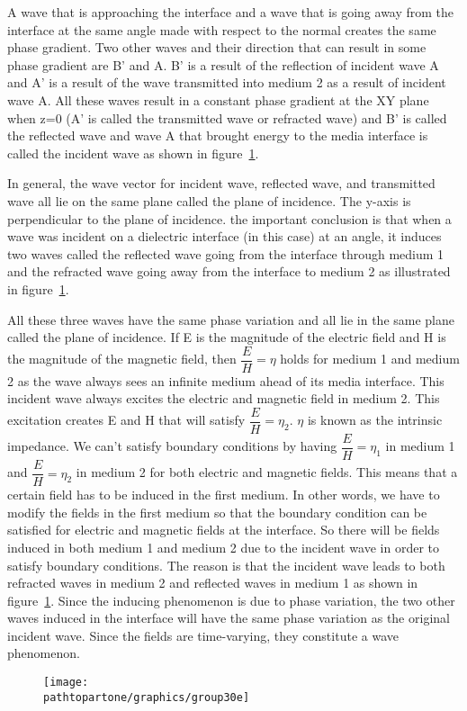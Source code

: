 A wave that is approaching the interface and a wave that is going away from the interface at the same angle made with respect to the normal creates the same phase gradient. Two other waves and their direction that can result in some phase gradient are B'
and A. B' is a result of the reflection of incident wave A and A' is a result of the wave transmitted into medium 2 as a result of incident wave A. All these waves result in a constant phase gradient at the XY plane when z=0 (A' is called the transmitted wave or refracted wave) and B' is called the reflected wave and wave A that brought energy to the media interface is called the incident wave as shown in figure~\ref{fig:group30e}.

In general, the wave vector for incident wave, reflected wave, and transmitted wave all lie on the same plane called the plane of incidence. The y-axis is perpendicular to the plane of incidence. the important conclusion is that when a wave was incident on a dielectric interface (in this case) at an angle, it induces two waves called the reflected wave going from the interface through medium 1  and the refracted wave going away from the interface to medium 2 as illustrated in figure~\ref{fig:group30e}.

All these three waves have the same phase variation and all lie in the same plane called the plane of incidence. If E is the magnitude of the electric field and H is the magnitude of the magnetic field, then $\dfrac{E}{H}=\eta$ holds for medium 1 and medium 2 as the wave always sees an infinite medium ahead of its media interface. This incident wave always excites the electric and magnetic field in medium 2. This excitation creates E and H that will satisfy $\dfrac{E}{H}=\eta_2$. $\eta$ is known as the intrinsic impedance. We can't satisfy boundary conditions by having $\dfrac{E}{H}=\eta_1$ in medium 1 and $\dfrac{E}{H}=\eta_2$ in medium 2 for both electric and magnetic fields. This means that a certain field has to be induced in the first medium. In other words, we have to modify the fields in the first medium so that the boundary condition can be satisfied for electric and magnetic fields at the interface. So there will be fields induced in both medium 1 and medium 2 due to the incident wave in order to satisfy boundary conditions. The reason is that the incident wave leads to both refracted waves in medium 2 and reflected waves in medium 1 as shown in figure~\ref{fig:group30e}. Since the inducing phenomenon is due to phase variation, the two other waves induced in the interface will have the same phase variation as the original incident wave. Since the fields are time-varying, they constitute a wave phenomenon.
\begin{figure}[h]
\centering
\texttt{[image: \\pathtopartone/graphics/group30e]}
\caption{}
\label{fig:group30e}
\end{figure}

